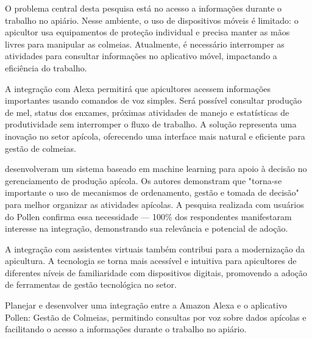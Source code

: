 O problema central desta pesquisa está no acesso a informações durante o trabalho no apiário. Nesse ambiente, o uso de dispositivos móveis é limitado: o apicultor usa equipamentos de proteção individual e precisa manter as mãos livres para manipular as colmeias. Atualmente, é necessário interromper as atividades para consultar informações no aplicativo móvel, impactando a eficiência do trabalho.

A integração com Alexa permitirá que apicultores acessem informações importantes usando comandos de voz simples. Será possível consultar produção de mel, status dos enxames, próximas atividades de manejo e estatísticas de produtividade sem interromper o fluxo de trabalho. A solução representa uma inovação no setor apícola, oferecendo uma interface mais natural e eficiente para gestão de colmeias.

\textcite{silva2021} desenvolveram um sistema baseado em machine learning para apoio à decisão no gerenciamento de produção apícola. Os autores demonstram que "torna-se importante o uso de mecanismos de ordenamento, gestão e tomada de decisão" \cite[p. 15]{silva2021} para melhor organizar as atividades apícolas. A pesquisa realizada com usuários do Pollen confirma essa necessidade — 100\% dos respondentes manifestaram interesse na integração, demonstrando sua relevância e potencial de adoção.

A integração com assistentes virtuais também contribui para a modernização da apicultura. A tecnologia se torna mais acessível e intuitiva para apicultores de diferentes níveis de familiaridade com dispositivos digitais, promovendo a adoção de ferramentas de gestão tecnológica no setor.



\label{sec:objetivos}

\label{ssec:objetivo-geral}

Planejar e desenvolver uma integração entre a Amazon Alexa e o aplicativo Pollen: Gestão de Colmeias, permitindo consultas por voz sobre dados apícolas e facilitando o acesso a informações durante o trabalho no apiário.

\label{ssec:objetivos-especificos}

